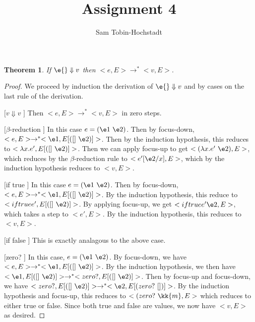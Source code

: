 \documentclass{article}[12pt]
\newtheorem{theorem}{Theorem}
\newcommand\red{\rightarrow^*}
\begin{document}
\title{Assignment 4}
\author{Sam Tobin-Hochstadt}

\newmeta{}
\newmeta{}
\newmeta{}

\maketitle

\begin{theorem}
  If $\e{} \Downarrow v$ then $<e,E> \rightarrow^* <v,E>$.
\end{theorem}

\begin{proof}
  We proceed by induction the derivation of $\e{} \Downarrow v$ and by
  cases on the last rule of the derivation.  


\item[[$v \Downarrow v$]] Then $<e,E> \rightarrow^* <v,E>$ in zero steps.

\item[[$\beta$-reduction]] In this case $e = (\e1\ \e2)$.  Then by focus-down,
  $<e,E> \rightarrow^* <\e1,E[([]\ \e2)]>$.  Then by the induction
  hypothesis, this reduces to $<\lambda x.e',E[([]\ \e2)]>$.  Then we
  can apply focus-up to get $<(\lambda x.e'\ \e2),E>$, which reduces
  by the $\beta$-reduction rule to $<e'[\e2/x],E>$, which by the
  induction hypothesis reduces to $<v,E>$.  

\item[[if true]] In this case $e = (\e1\ \e2)$.  Then by focus-down,
  $<e,E> \rightarrow^* <\e1,E[([]\ \e2)]>$. By the induction
  hypothesis, this reduce to $<if true e',E[([]\ \e2)]>$.  By applying
  focus-up, we get $<if true e' \e2,E>$, which takes a step to
  $<e',E>$.  By the induction hypothesis, this reduces to $<v,E>$.  

\item[[if false]] This is exactly analagous to the above case.

\item[[zero?]] In this case, $e = (\e1\ \e2)$.  By focus-down, we have
  $<e,E> \rightarrow^* <\e1,E[([]\ \e2)]>$. By the induction
  hypothesis, we then have $<\e1,E[([]\ \e2)]> \red <zero?,E[([]\
  \e2)]>$.  Then by focus-up and focus-down, we have $<zero?,E[([]\
  \e2)]> \red <\e2,E[(zero?\ [])]>$.  By the induction hypothesis and
  focus-up, this reduces to $<(zero?\ \kk{m},E>$ which reduces to
  either true or false.  Since both true and false are values, we now
  have $<v,E>$ as desired.


\end{proof}
\end{document}
